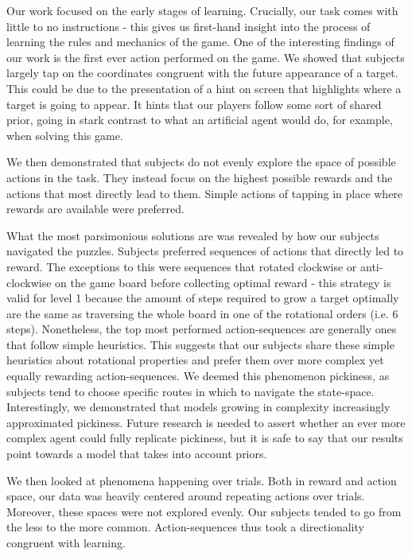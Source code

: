 \documentclass[11pt]{article}
\begin{document}
Our work focused on the early stages of learning. Crucially, our task comes with little to no instructions -  this gives us first-hand insight into the process of learning the rules and mechanics of the game. One of the interesting findings of our work is the first ever action performed on the game. We showed that subjects largely tap on the coordinates congruent with the future appearance of a target. This could be due to the presentation of a hint on screen that highlights where a target is going to appear. It hints that our players follow some sort of shared prior, going in stark contrast to what an artificial agent would do, for example, when solving this game.

We then demonstrated that subjects do not evenly explore the space of possible actions in the task. They instead focus on the highest possible rewards and the actions that most directly lead to them. Simple actions of tapping in place where rewards are available were preferred.

What  the most parsimonious solutions are was revealed by how our subjects navigated the puzzles. Subjects preferred sequences of actions that directly led to reward. The exceptions to this were sequences that rotated clockwise or anti-clockwise on the game board before collecting optimal reward - this strategy is valid for level 1 because the amount of steps required to grow a target optimally are the same as traversing the whole board in one of the rotational orders (i.e. 6 steps). Nonetheless, the top most performed action-sequences are generally ones that follow simple heuristics. This suggests that our subjects share these simple heuristics about rotational properties and prefer them over more complex yet equally rewarding action-sequences. We deemed this phenomenon pickiness, as subjects tend to choose specific routes in which to navigate the state-space. Interestingly, we demonstrated that models growing in complexity increasingly approximated pickiness. Future research is needed to assert whether an ever more complex agent could fully replicate pickiness, but it is safe to say that our results point towards a model that takes into account priors.

We then looked at phenomena happening over trials. Both in reward and action space, our data was heavily centered around repeating actions over trials. Moreover, these spaces were not explored evenly. Our subjects tended to go from the less to  the more common. Action-sequences thus took a directionality congruent with learning.
\end{document}
